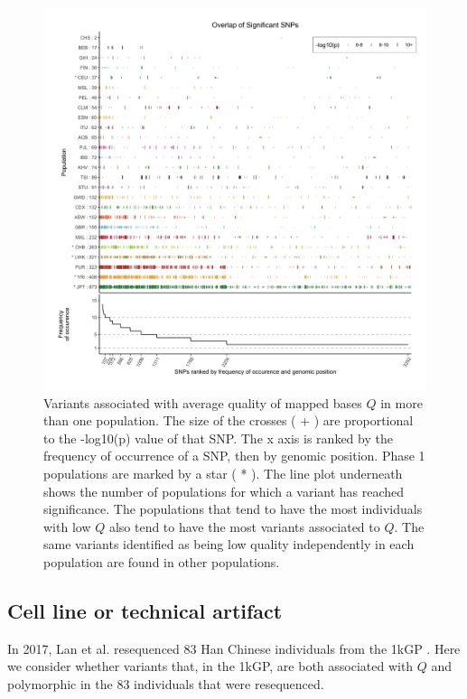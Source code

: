 \documentclass[9pt,lineno]{elife}
\begin{document}
\begin{figure}
\includegraphics[width=\hsize,keepaspectratio]{./Figures/SNPOverlap6.jpg}

\caption{Variants associated with average quality of mapped bases $Q$ in more than one population.
The size of the crosses ( + ) are proportional to the -log10(p) value of that SNP.
The x axis is ranked by the frequency of occurrence of a SNP, then by genomic position.
Phase 1 populations are marked by a star ( * ).
The line plot underneath shows the number of populations for which a variant has reached significance.
The populations that tend to have the most individuals with low $Q$ also tend to have the most variants associated to $Q$. 
The same variants identified as being low quality independently in each population are found in other populations. }
  \label{OverLap}
\end{figure}

\subsection{Cell line or technical artifact}

In 2017, Lan et al. resequenced 83 Han Chinese individuals from the 1kGP \citep{Lan2017}. 
Here we consider whether variants that, in the 1kGP, are both associated with $Q$ and polymorphic in the 83 individuals that were resequenced.
\end{document}
